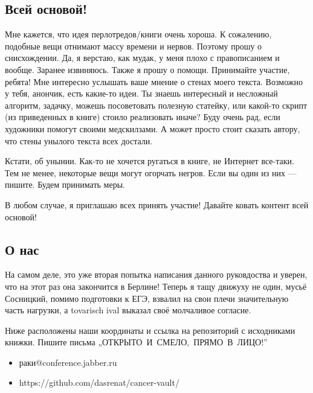 \subsection{Всей основой!}

Мне кажется, что идея перлотредов/книги очень хороша. К сожалению,
подобные вещи отнимают массу времени и нервов. Поэтому прошу о
снисхождении. Да, я верстаю, как мудак, у меня плохо с правописанием и вообще.
Заранее извиняюсь. Также я прошу о помощи. Принимайте участие, ребята!
Мне интересно услышать ваше мнение о стенах моего текста. Возможно
у тебя, анончик, есть какие-то идеи. Ты знаешь интересный и несложный
алгоритм, задачку, можешь посоветовать полезную статейку, или какой-то скрипт
(из приведенных в книге) стоило реализовать иначе? Буду очень рад,
если художники помогут своими медскилзами. А может просто стоит сказать
автору, что стены унылого текста всех достали.

Кстати, об унынии. Как-то не хочется ругаться в книге, не Интернет все-таки.
Тем не менее, некоторые вещи могут огорчать негров. Если вы один
из них — пишите. Будем принимать меры.

В любом случае, я приглашаю всех принять участие! Давайте ковать
контент всей основой!

\subsection{О нас}

На самом деле, это уже вторая попытка написания данного руковдоства и уверен,
что на этот раз она закончится в Берлине! Теперь я тащу движуху не один, мусьё
Сосницкий, помимо подготовки к ЕГЭ, взвалил на свои плечи значительную часть
нагрузки, а tovarisch ival выказал своё молчаливое согласие.

Ниже расположены наши координаты и ссылка на репозиторий с исходниками книжки.
Пишите письма \mbox{„ОТКРЫТО И СМЕЛО, ПРЯМО В ЛИЦО!”}

\begin{itemize}
\item раки@conference.jabber.ru
\item https://github.com/dasrenat/cancer-vault/
\end{itemize}


